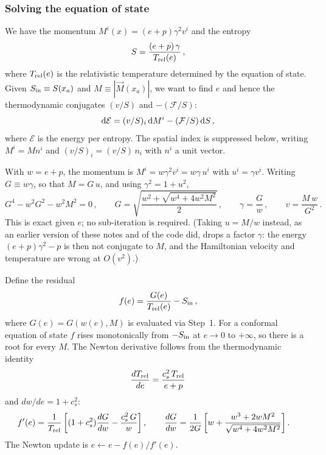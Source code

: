 \documentclass[12pt,aps,preprint,nofootinbib,noshowkeys,noshowpacs,longbibliography,superscriptaddress,tightenlines]{revtex4-2}
\def\F{{\mathcal F}}
\def\st{\begin{equation}}
\def\stp{\end{equation}}
\def\E{{\mathcal E}}
\def\dd{{\rm d}}
\begin{document}
\subsubsection{Solving the equation of state}
\label{sec:eos}



We have the momentum $M^i(x) = (e + p) \gamma^2 v^i$ and the entropy
\st
    S = \frac{(e+p)\,\gamma}{T_{\rm rel}(e)} \, ,
\stp
where $T_{\rm rel}(e)$ is the relativistic temperature determined by the
equation of state.  Given $S_{\rm in} \equiv S(x_a)$ and
$M \equiv |\vec M(x_a)|$, we want to find $e$ and hence the thermodynamic
conjugates $(v/S)$ and $-(\F/S)$:
\st
 \dd \E = (v/S)_i \, \dd M^i  -  (\F/S) \, \dd S \, ,
\stp
where $\E$ is the energy per entropy.
The spatial index is suppressed below, writing $M^i = M n^i$ and
$(v/S)_i = (v/S)\, n_i$ with $n^i$ a unit vector.

With $w=e+p$, the momentum is $M^i=w\gamma^2v^i=w\gamma\,u^i$ with $u^i=\gamma v^i$.
Writing $G\equiv w\gamma$, so that $M=G\,u$, and using $\gamma^2=1+u^2$,
\st
G^4-w^2G^2-w^2M^2=0\,,\qquad
G=\sqrt{\frac{w^2+\sqrt{w^4+4w^2M^2}}{2}}\,,\qquad
\gamma=\frac{G}{w}\,,\qquad v=\frac{M\,w}{G^2}\,.
\stp
This is exact given $e$; no sub-iteration is required.  (Taking $u=M/w$ instead, as
an earlier version of these notes and of the code did, drops a factor $\gamma$: the
energy $(e+p)\gamma^2-p$ is then not conjugate to $M$, and the Hamiltonian velocity
and temperature are wrong at $O(v^2)$.)

Define the residual
\st
    f(e) = \frac{G(e)}{T_{\rm rel}(e)} - S_{\rm in} \, ,
\stp
where $G(e)=G(w(e),M)$ is evaluated via Step~1.  For a conformal equation of state
$f$ rises monotonically from $-S_{\rm in}$ at $e\to0$ to $+\infty$, so there is a
root for every $M$.  The Newton derivative follows from the thermodynamic identity
\st
    \frac{dT_{\rm rel}}{de} = \frac{c_s^2\,T_{\rm rel}}{e+p}
\stp
and $dw/de=1+c_s^2$:
\begin{align}
    f'(e) &= \frac{1}{T_{\rm rel}}\left[(1+c_s^2)\frac{dG}{dw}-\frac{c_s^2\,G}{w}\right],\qquad
    \frac{dG}{dw}=\frac{1}{2G}\left[w+\frac{w^3+2wM^2}{\sqrt{w^4+4w^2M^2}}\right].
\end{align}
The Newton update is $e \leftarrow e - f(e)/f'(e)$.
\end{document}
